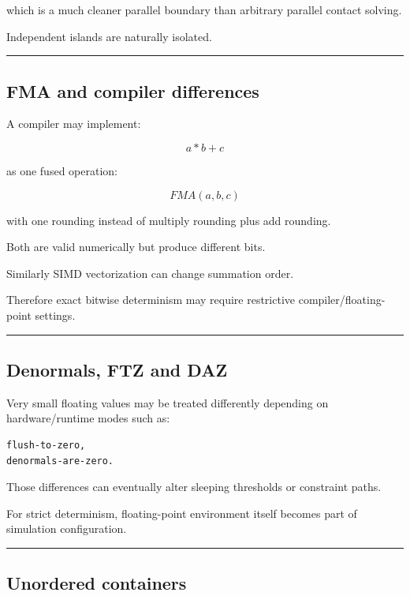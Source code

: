 which is a much cleaner parallel boundary than arbitrary parallel contact solving.

Independent islands are naturally isolated.

\begin{center}\rule{0.5\linewidth}{0.5pt}\end{center}

\subsection{FMA and compiler differences}\label{06-engine-ii-ch039-fma-and-compiler-differences}

A compiler may implement:

\[
a*b+c
\]

as one fused operation:

\[
FMA(a,b,c)
\]

with one rounding instead of multiply rounding plus add rounding.

Both are valid numerically but produce different bits.

Similarly SIMD vectorization can change summation order.

Therefore exact bitwise determinism may require restrictive compiler/floating-point settings.

\begin{center}\rule{0.5\linewidth}{0.5pt}\end{center}

\subsection{Denormals, FTZ and DAZ}\label{06-engine-ii-ch039-denormals-ftz-and-daz}

Very small floating values may be treated differently depending on hardware/runtime modes such as:

\begin{verbatim}
flush-to-zero,
denormals-are-zero.
\end{verbatim}

Those differences can eventually alter sleeping thresholds or constraint paths.

For strict determinism, floating-point environment itself becomes part of simulation configuration.

\begin{center}\rule{0.5\linewidth}{0.5pt}\end{center}

\subsection{Unordered containers}\label{06-engine-ii-ch039-unordered-containers}

